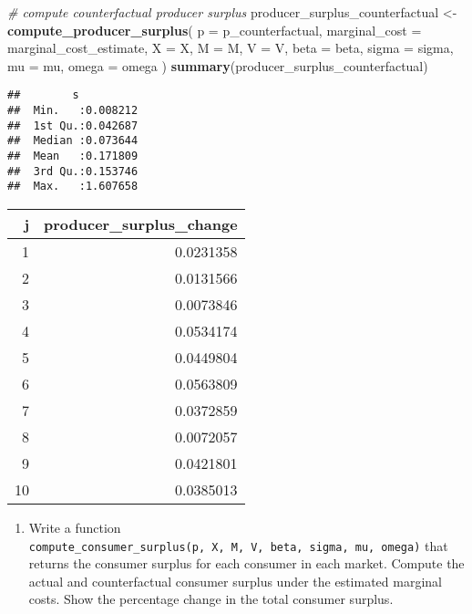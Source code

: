 \documentclass[
]{book}
\newenvironment{Shaded}{\begin{snugshade}}{\end{snugshade}}
\newcommand{\AttributeTok}[1]{\textcolor[rgb]{0.13,0.29,0.53}{#1}}
\newcommand{\CommentTok}[1]{\textcolor[rgb]{0.56,0.35,0.01}{\textit{#1}}}
\newcommand{\FunctionTok}[1]{\textcolor[rgb]{0.13,0.29,0.53}{\textbf{#1}}}
\newcommand{\NormalTok}[1]{#1}
\newcommand{\OtherTok}[1]{\textcolor[rgb]{0.56,0.35,0.01}{#1}}
\providecommand{\tightlist}{%
  \setlength{\itemsep}{0pt}\setlength{\parskip}{0pt}}
\begin{document}
\begin{Shaded}
\begin{Highlighting}[]
\CommentTok{\# compute counterfactual producer surplus}
\NormalTok{producer\_surplus\_counterfactual }\OtherTok{\textless{}{-}}
  \FunctionTok{compute\_producer\_surplus}\NormalTok{(}
    \AttributeTok{p =}\NormalTok{ p\_counterfactual, }
    \AttributeTok{marginal\_cost =}\NormalTok{ marginal\_cost\_estimate, }
    \AttributeTok{X =}\NormalTok{ X, }
    \AttributeTok{M =}\NormalTok{ M, }
    \AttributeTok{V =}\NormalTok{ V, }
    \AttributeTok{beta =}\NormalTok{ beta, }
    \AttributeTok{sigma =}\NormalTok{ sigma, }
    \AttributeTok{mu =}\NormalTok{ mu, }
    \AttributeTok{omega =}\NormalTok{ omega}
\NormalTok{    )}
\FunctionTok{summary}\NormalTok{(producer\_surplus\_counterfactual)}
\end{Highlighting}
\end{Shaded}

\begin{verbatim}
##        s           
##  Min.   :0.008212  
##  1st Qu.:0.042687  
##  Median :0.073644  
##  Mean   :0.171809  
##  3rd Qu.:0.153746  
##  Max.   :1.607658
\end{verbatim}

\begin{tabular}{r|r}
\hline
j & producer\_surplus\_change\\
\hline
1 & 0.0231358\\
\hline
2 & 0.0131566\\
\hline
3 & 0.0073846\\
\hline
4 & 0.0534174\\
\hline
5 & 0.0449804\\
\hline
6 & 0.0563809\\
\hline
7 & 0.0372859\\
\hline
8 & 0.0072057\\
\hline
9 & 0.0421801\\
\hline
10 & 0.0385013\\
\hline
\end{tabular}

\begin{enumerate}
\def\labelenumi{\arabic{enumi}.}
\setcounter{enumi}{3}
\tightlist
\item
  Write a function \texttt{compute\_consumer\_surplus(p,\ X,\ M,\ V,\ beta,\ sigma,\ mu,\ omega)} that returns the consumer surplus for each consumer in each market. Compute the actual and counterfactual consumer surplus under the estimated marginal costs. Show the percentage change in the total consumer surplus.
\end{enumerate}
\end{document}
